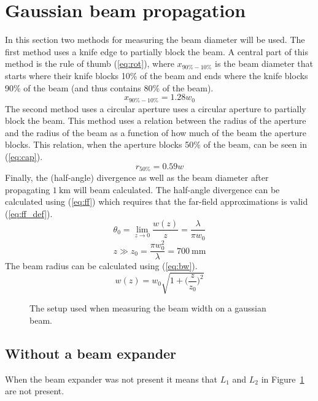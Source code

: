 \documentclass[12pt,a4paper]{article}
\begin{document}
\section{Gaussian beam propagation}
In this section two methods for measuring the beam diameter will be used. The first method uses a knife edge to partially block the beam. A central part of this method is the rule of thumb (\ref{eq:rot}), where $x_{90\%-10\%}$ is the beam diameter that starts where their knife blocks 10\% of the beam and ends where the knife blocks 90\% of the beam (and thus contains 80\% of the beam).
\begin{equation}
  \label{eq:rot}
  x_{90\%-10\%}=1.28w_0
\end{equation}
The second method uses a circular aperture uses a circular aperture to partially block the beam. This method uses a relation between the radius of the aperture and the radius of the beam as a function of how much of the beam the aperture blocks. This relation, when the aperture blocks 50\% of the beam, can be seen in (\ref{eq:cap}).
\begin{equation}
  \label{eq:cap}
  r_{50\%}=0.59w
\end{equation}
Finally, the (half-angle) divergence as well as the beam diameter after propagating $\SI{1}{\kilo\metre}$ will beam calculated. The half-angle divergence can be calculated using (\ref{eq:ff}) which requires that the far-field approximations is valid (\ref{eq:ff_def}).
\begin{equation}
  \label{eq:ff}
  \theta_0=\lim_{z\rightarrow 0}\frac{w(z)}{z}=\frac{\lambda}{\pi w_0}
\end{equation}
\begin{equation}
  \label{eq:ff_def}
  z \gg z_0=\frac{\pi w_0^2}{\lambda}=\SI{700}{\milli\metre}
\end{equation}
The beam radius can be calculated using (\ref{eq:bw}).
\begin{equation}
  \label{eq:bw}
  w(z)=w_0\sqrt{1+\Big(\frac{z}{z_0}\Big)^2}
\end{equation}
\begin{figure}
  \centering
  \noindent\makebox[\textwidth]{\scalebox{0.90}{}}
  \caption{The setup used when measuring the beam width on a gaussian beam.}
  \label{fig:gauss_setup}
\end{figure}
\subsection{Without a beam expander}
When the beam expander was not present it means that $L_1$ and $L_2$ in Figure~\ref{fig:gauss_setup} are not present.
\end{document}
